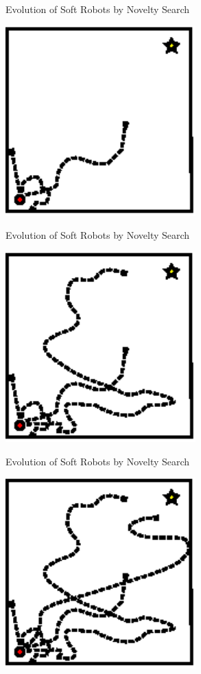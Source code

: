 \documentclass[6pt]{beamer}
\begin{document}
\begin{frame}{{\scriptsize Evolution of Soft Robots by} Novelty Search}
\begin{center}
\includegraphics[width=0.55\textwidth]{../Figures/Misc/mazeEasy3.eps}
\end{center}
\end{frame}

\begin{frame}{{\scriptsize Evolution of Soft Robots by} Novelty Search}
\begin{center}
\includegraphics[width=0.55\textwidth]{../Figures/Misc/mazeEasy4.eps}
\end{center}
\end{frame}

\begin{frame}{{\scriptsize Evolution of Soft Robots by} Novelty Search}
\begin{center}
\includegraphics[width=0.55\textwidth]{../Figures/Misc/mazeEasy5.eps}
\end{center}
\end{frame}
\end{document}
